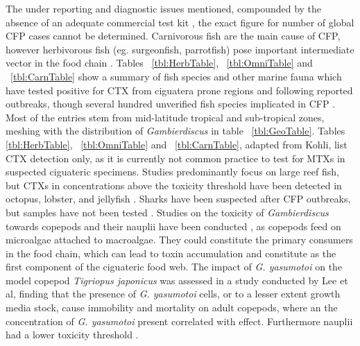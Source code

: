 \documentclass[12pt]{article}
\begin{document}
The under reporting and diagnostic issues mentioned, compounded by the absence of an adequate commercial test kit \cite{wong2005study}, the exact figure for number of global CFP cases cannot be determined. Carnivorous fish are the main cause of CFP, however herbivorous fish (eg. surgeonfish, parrotfish) pose important intermediate vector in the food chain \cite{cruz2006macroalgal,randall1958review,mak2013pacific}.%
Tables ~\ref{tbl:HerbTable}, ~\ref{tbl:OmniTable} and ~\ref{tbl:CarnTable} show a summary of fish species and other marine fauna which have tested positive for CTX from ciguatera prone regions and following reported outbreaks, though several hundred unverified fish species implicated in CFP \cite{fao2004ciguatera}. %
Most of the entries stem from mid-latitude tropical and sub-tropical zones, meshing with the distribution of \emph{Gambierdiscus} in table ~\ref{tbl:GeoTable}. Tables \ref{tbl:HerbTable}, ~\ref{tbl:OmniTable} and ~\ref{tbl:CarnTable}, adapted from Kohli, \cite{kohli2013Gambierdiscus} list CTX detection only, as it is currently not common practice to test for MTXs in suspected ciguateric specimens. 
Studies predominantly focus on large reef fish, but CTXs in concentrations above the toxicity  threshold have been detected in octopus, lobster, and jellyfish \cite{mak2013pacific,zlotnick1995ciguatera}.
Sharks have been suspected after CFP outbreaks, but samples have not been tested \cite{boisier1995fatal,lehane2000ciguatera,habermehl1994severe,habermehl1994severe}. 
Studies on the toxicity of \emph{Gambierdiscus} towards copepods and their nauplii have been conducted \cite{lee2014toxicity}, as copepods feed on microalgae attached to macroalgae. They could constitute the primary consumers in the food chain, which can lead to toxin accumulation \cite{raisuddin2007copepod} and constitute as the first component of the ciguateric food web. The impact of \emph{G. yasumotoi} on the model copepod \emph{Tigriopus japonicus} was assessed in a study conducted by Lee et al, finding that the presence of \emph{G. yasumotoi} cells, or to a lesser extent growth media stock, cause immobility and mortality on adult copepods, where an the concentration of \emph{G. yasumotoi} present correlated with effect. Furthermore nauplii had a lower toxicity threshold \cite{lee2014toxicity}. \\
\end{document}
